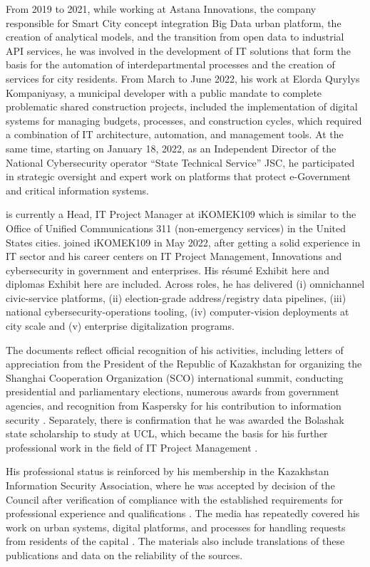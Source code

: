 From 2019 to 2021, while working at Astana Innovations, the company responsible for Smart City concept integration Big Data urban platform, the creation of analytical models, and the transition from open data to industrial API services, he was involved in the development of IT solutions that form the basis for the automation of interdepartmental processes and the creation of services for city residents. From March to June 2022, his work at Elorda Qurylys Kompaniyasy, a municipal developer with a public mandate to complete problematic shared construction projects, included the implementation of digital systems for managing budgets, processes, and construction cycles, which required a combination of IT architecture, automation, and management tools. At the same time, starting on January 18, 2022, as an Independent Director of the National Cybersecurity operator ``State Technical Service'' JSC, he participated in strategic oversight and expert work on platforms that protect e-Government and critical information systems.

\mrl{} is currently a Head, IT Project Manager at iKOMEK109 which is similar to the Office of Unified Communications 311 (non-emergency services) in the United States cities. \mrl{} joined iKOMEK109 in May 2022, after getting a solid experience in IT sector and his career centers on IT Project Management, Innovations and cybersecurity in government and enterprises. His résumé {Exhibit here} and diplomas {Exhibit here} are included. Across roles, he has delivered (i) omnichannel civic-service platforms, (ii) election-grade address/registry data pipelines, (iii) national cybersecurity-operations tooling, (iv) computer-vision deployments at city scale and (v) enterprise digitalization programs.

The documents reflect official recognition of his activities, including letters of appreciation from the President of the Republic of Kazakhstan for organizing the Shanghai Cooperation Organization (SCO) international summit, conducting presidential and parliamentary elections, numerous awards from government agencies, and recognition from Kaspersky for his contribution to information security . Separately, there is confirmation that he was awarded the Bolashak state scholarship to study at UCL, which became the basis for his further professional work in the field of IT Project Management .

His professional status is reinforced by his membership in the Kazakhstan Information Security Association, where he was accepted by decision of the Council after verification of compliance with the established requirements for professional experience and qualifications . The media has repeatedly covered his work on urban systems, digital platforms, and processes for handling requests from residents of the capital . The materials also include translations of these publications and data on the reliability of the sources.


